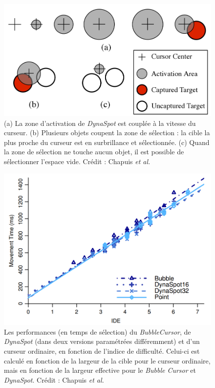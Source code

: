	\begin{figure}[ht]
		\centering
		\includegraphics[width=\textwidth]{figures/dynaSpot}
		\caption{(a) La zone d'activation de \emph{DynaSpot} est couplée à la vitesse du curseur. (b) Plusieurs objets coupent la zone de sélection : la cible la plus proche du curseur est en surbrillance et sélectionnée. (c) Quand la zone de sélection ne touche aucun objet, il est possible de sélectionner l'espace vide. Crédit : Chapuis \emph{et al.}}
		\label{fig:dynaSpot}
	\end{figure}
	
	\begin{figure}[ht]
		\centering
		\includegraphics[width=\textwidth]{figures/dynaResults}
		\caption{Les performances (en temps de sélection) du \emph{BubbleCursor}, de \emph{DynaSpot} (dans deux versions paramétrées différemment) et d'un curseur ordinaire, en fonction de l'indice de difficulté. Celui-ci est calculé en fonction de la largeur de la cible pour le curseur ordinaire, mais en fonction de la largeur effective pour le \emph{Bubble Cursor} et \emph{DynaSpot}. Crédit : Chapuis \emph{et al.}}
		\label{fig:dynaResults}
	\end{figure}

